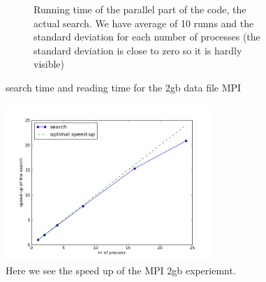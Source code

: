 \documentclass[a4paper,10pt]{article}
\begin{document}
\begin{figure}[h!t]
\begin{subfigure}[b]{0.70\textwidth}
                \caption{Running time of the parallel part of the code, the actual search. 
                         We have average of 10 runns and the standard deviation for each number
                         of processes (the standard deviation is close to zero so it is hardly 
                         visible)}
                \label{fig:mpio2_search}
        \end{subfigure}
        \caption{search time and reading time for the 2gb data file MPI}
\end{figure}

\begin{figure}[htb]
  \centering
  \includegraphics[width=0.7\textwidth]{graphics/mpio2gb_take2/search_speedup.png}
  \caption{Here we see the speed up of the MPI 2gb experiemnt.}
  \label{fig:mpio2_speedup}
\end{figure}
\end{document}
